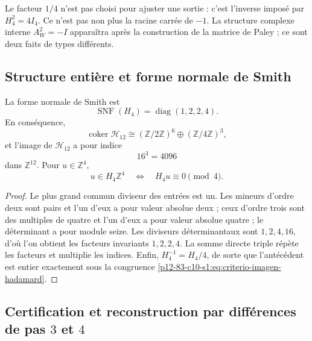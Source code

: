 Le facteur \(1/4\) n’est pas choisi pour ajuster une sortie : c’est l’inverse
imposé par \(H_4^2=4I_4\). Ce n’est pas non plus la racine carrée de \(-1\). La
structure complexe interne \(A_W^2=-I\) apparaîtra après la construction de la
matrice de Paley ; ce sont deux faits de types différents.

\subsection{Structure entière et forme normale de Smith}

\begin{theorem}
\label{p12-83-c10-s1:thm:smith-hadamard-autonomo}
La forme normale de Smith est
\begin{equation}
 \operatorname{SNF}(H_4)=\operatorname{diag}(1,2,2,4).
 \label{p12-83-c10-s1:eq:snf-hadamard-autonoma}
\end{equation}
En conséquence,
\begin{equation}
 \operatorname{coker}\mathcal H_{12}
 \cong(\mathbb Z/2\mathbb Z)^6
 \oplus(\mathbb Z/4\mathbb Z)^3,
 \label{p12-83-c10-s1:eq:cociente-hadamard-doce}
\end{equation}
et l’image de \(\mathcal H_{12}\) a pour indice
\[
 16^3=4096
\]
dans \(\mathbb Z^{12}\). Pour \(u\in\mathbb Z^4\),
\begin{equation}
 u\in H_4\mathbb Z^4
 \quad\Longleftrightarrow\quad
 H_4u\equiv0\pmod4.
 \label{p12-83-c10-s1:eq:criterio-imagen-hadamard}
\end{equation}
\end{theorem}

\begin{proof}
Le plus grand commun diviseur des entrées est un. Les mineurs d’ordre deux sont
pairs et l’un d’eux a pour valeur absolue deux ; ceux d’ordre trois sont des multiples de
quatre et l’un d’eux a pour valeur absolue quatre ; le déterminant a pour module
seize. Les diviseurs déterminantaux sont \(1,2,4,16\), d’où l’on obtient
les facteurs invariants \(1,2,2,4\). La somme directe triple répète les
facteurs et multiplie les indices. Enfin,
\(H_4^{-1}=H_4/4\), de sorte que l’antécédent est entier exactement sous la
congruence \eqref{p12-83-c10-s1:eq:criterio-imagen-hadamard}.
\end{proof}

\subsection{Certification et reconstruction par différences de pas \(3\) et \(4\)}

